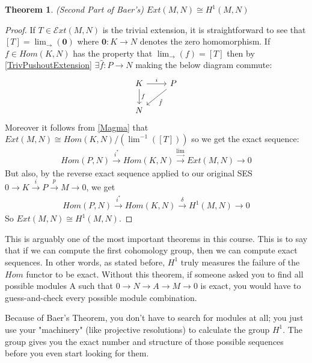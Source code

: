 \documentclass[12pt]{book}
\newtheorem{theorem}{Theorem}[chapter]
\theoremstyle{definition}
\begin{document}
\begin{theorem}(Second Part of Baer's)
    $Ext(M,N) \cong H^1(M,N)$ 
\end{theorem}
\begin{proof}
    If $T \in \mathcal{E}xt(M,N)$ is the trivial extension, it is straightforward to see that $[T] = \lim_{\rightarrow}(\mathbf{0})$ where $\mathbf{0} : K \to N$ denotes the zero homomorphism.
    If $f \in Hom(K,N)$ has the property that $\lim_{\rightarrow}(f) = [T]$ then by \ref{TrivPushoutExtension} $\exists \hat{f}: P \to N$ making the below diagram commute:
    \[
    \begin{tikzcd}
        K \arrow[d, "f"] \arrow[r, "i"] & P \arrow[ld, "\hat{f}"]\\
        N
    \end{tikzcd}
    \]
    Moreover it follows from \ref{Magma} that $Ext(M,N) \cong Hom(K,N)/(\lim^{-1}([T]))$ so we get the exact sequence: 
    \begin{align*}
        Hom(P,N) \xrightarrow{i^*}  Hom(K,N) \xrightarrow{\lim_{\rightarrow}} Ext(M,N) \rightarrow 0
    \end{align*}
    But also, by the reverse exact sequence applied to our original SES $0 \rightarrow K \xrightarrow{i} P \xrightarrow{p} M \rightarrow 0$, we get 
    \begin{align*}
        Hom(P,N) \xrightarrow{i^*} Hom(K,N) \xrightarrow{\delta} H^1(M,N) \rightarrow 0
    \end{align*}
    So $Ext(M,N) \cong H^1(M,N)$. 
\end{proof}


This is arguably one of the most important theorems in this course. This is to say that if we can compute the first cohomology group, then we can compute exact sequences. In other words, as stated before, $H^1$ truly measures the failure of the $Hom$ functor to be exact. Without this theorem, if someone asked you to find all possible modules A such that $0 \rightarrow N \rightarrow A\rightarrow M\rightarrow 0$ is exact, you would have to guess-and-check every possible module combination.

Because of Baer's Theorem, you don't have to search for modules at all; you just use your "machinery" (like projective resolutions) to calculate the group $H^1$. The group gives you the exact number and structure of those possible sequences before you even start looking for them.
\end{document}
